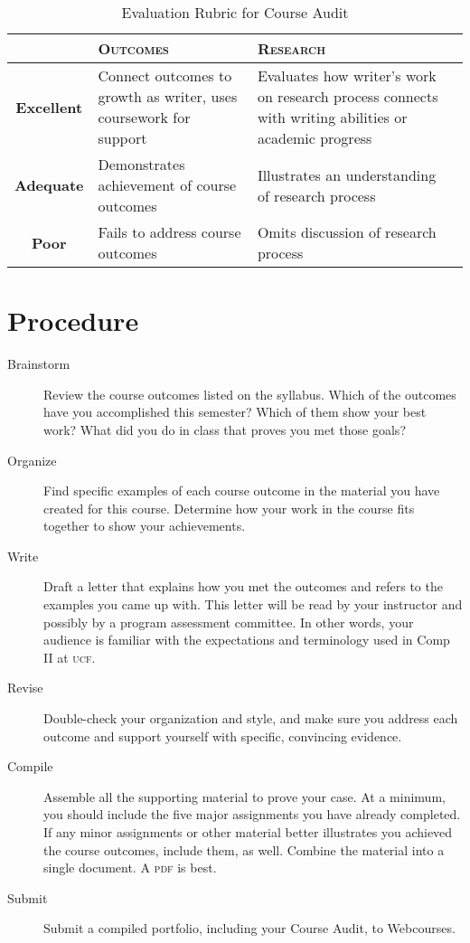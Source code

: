 \documentclass[10pt,twocolumn]{amsart}	%
\begin{document}
\begin{table}[b]
	\caption{Evaluation Rubric for Course Audit}\label{tab:rubric}
	\small
\begin{tabulary}{\columnwidth}{cLLL}
	\toprule  & \textbf{\textsc{Outcomes}} & \textbf{\textsc{Research}}\\
\midrule	\textbf{Excellent} 
& Connect outcomes to growth as writer, uses coursework for support 
& Evaluates how writer's work on research process connects with writing abilities or academic progress \\
\midrule	\textbf{Adequate} 
& Demonstrates achievement of course outcomes 
& Illustrates an understanding of research process \\
\midrule	\textbf{Poor} 
& Fails to address course outcomes 
& Omits discussion of research process \\
	\bottomrule
\end{tabulary}
\end{table}

\newpage
\section{Procedure} %
\label{sec:procedure}
\begin{description}
	\item[Brainstorm] Review the course outcomes listed on the syllabus. Which of the outcomes have you accomplished this semester? Which of them show your best work? What did you do in class that proves you met those goals?
	\item[Organize] Find specific examples of each course outcome in the material you have created for this course. Determine how your work in the course fits together to show your achievements.
	\item[Write] Draft a letter that explains how you met the outcomes and refers to the examples you came up with. This letter will be read by your instructor and possibly by a program assessment committee. In other words, your audience is familiar with the expectations and terminology used in Comp II at \textsc{ucf}.
	\item[Revise] Double-check your organization and style, and make sure you address each outcome and support yourself with specific, convincing evidence.
	\item[Compile] Assemble all the supporting material to prove your case. At a minimum, you should include the five major assignments you have already completed. If any minor assignments or other material better illustrates you achieved the course outcomes, include them, as well. Combine the material into a single document. A \textsc{pdf} is best.
	\item[Submit] Submit a compiled portfolio, including your Course Audit, to Webcourses.
\end{description}
\end{document}

